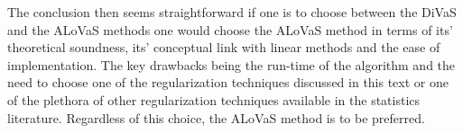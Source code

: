 The conclusion then seems straightforward if one is to choose between the DiVaS and the ALoVaS methods one would choose the ALoVaS method in terms of its' theoretical soundness, its' conceptual link with linear methods and the ease of implementation. The key drawbacks being the run-time of the algorithm and the need to choose one of the regularization techniques discussed in this text or one of the plethora of other regularization techniques available in the statistics literature.  Regardless of this choice, the ALoVaS method is to be preferred. 

